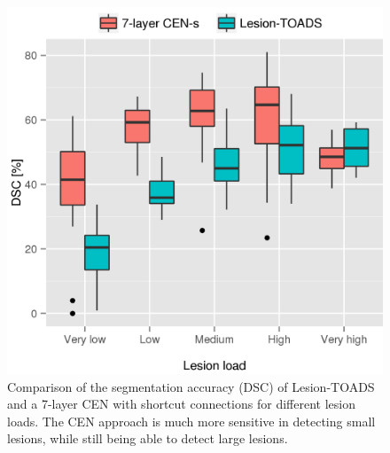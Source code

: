 \begin{figure}[tb] \centering
\includegraphics[width=\columnwidth]{figures/TMI_boxplot_LTvsL2}
\caption[Comparison of the segmentation accuracy of Lesion-TOADS and a 7-layer
CEN with shortcut connections for different lesion loads]{Comparison of the
segmentation accuracy (DSC) of Lesion-TOADS and a 7-layer CEN with shortcut
connections for different lesion loads. The CEN approach is much more sensitive
in detecting small lesions, while still being able to detect large lesions.}
\label{fig:l2vlt}
\end{figure}

